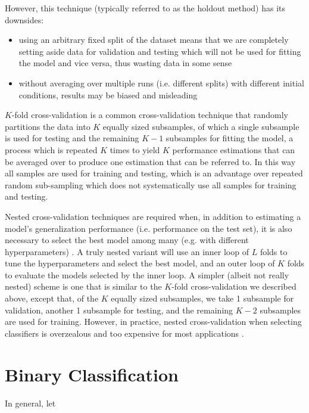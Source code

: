 However, this technique (typically referred to as the holdout method) has its downsides:

\begin{itemize}
    \item using an arbitrary fixed split of the dataset means that we are completely setting aside data for validation and testing which will not be used for fitting the model and vice versa, thus wasting data in some sense
    \item without averaging over multiple runs (i.e. different splits) with different initial conditions, results may be biased and misleading
\end{itemize}

$K$-fold cross-validation is a common cross-validation technique that randomly partitions the data into $K$ equally sized subsamples, of which a single subsample is used for testing and the remaining $K-1$ subsamples for fitting the model, a process which is repeated $K$ times to yield $K$ performance estimations that can be averaged over to produce one estimation that can be referred to. In this way all samples are used for training and testing, which is an advantage over repeated random sub-sampling which does not systematically use all samples for training and testing.

Nested cross-validation techniques are required when, in addition to estimating a model's generalization performance (i.e. performance on the test set), it is also necessary to select the best model among many (e.g. with different hyperparameters) \cite{crossvalidationbias}. A truly nested variant will use an inner loop of $L$ folds to tune the hyperparameters and select the best model, and an outer loop of $K$ folds to evaluate the models selected by the inner loop. A simpler (albeit not really nested) scheme is one that is similar to the $K$-fold cross-validation we described above, except that, of the $K$ equally sized subsamples, we take 1 subsample for validation, another 1 subsample for testing, and the remaining $K-2$ subsamples are used for training. However, in practice, nested cross-validation when selecting classifiers is overzealous and too expensive for most applications \cite{nestedcvoverzealous}.

\section{Binary Classification}

In general, let

